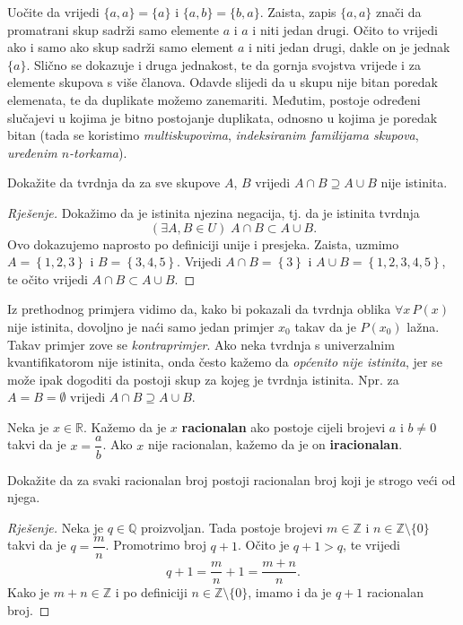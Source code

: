 \begin{remark}
Uočite da vrijedi $\{a, a\}=\{a\}$ i $\{a, b\}=\{b, a\}$. Zaista, zapis $\{a, a\}$ znači da promatrani skup sadrži samo elemente $a$ i $a$ i niti jedan drugi. Očito to vrijedi ako i samo ako skup sadrži samo element $a$ i niti jedan drugi, dakle on je jednak $\{a\}$. Slično se dokazuje i druga jednakost, te da gornja svojstva vrijede i za elemente skupova s više članova. Odavde slijedi da u skupu nije bitan poredak elemenata, te da duplikate možemo zanemariti. Međutim, postoje određeni slučajevi u kojima je bitno postojanje duplikata, odnosno u kojima je poredak bitan (tada se koristimo \textit{multiskupovima}, \textit{indeksiranim familijama skupova}, \textit{uređenim $n$-torkama}).
\end{remark}
\begin{exercise}
Dokažite da tvrdnja da za sve skupove $A$, $B$ vrijedi $A\cap B\supseteq A\cup B$ nije istinita.
\end{exercise}
\begin{proof}[Rješenje]
Dokažimo da je istinita njezina negacija, tj. da je istinita tvrdnja 
$$\left(\exists A, B\in U\right)\; A\cap B\subset A\cup B.$$
Ovo dokazujemo naprosto po definiciji unije i presjeka. Zaista, uzmimo $A=\left\{1, 2, 3\right\}$ i $B=\left\{3, 4, 5\right\}$. Vrijedi $A\cap B=\left\{3\right\}$ i $A\cup B=\left\{1, 2, 3, 4, 5\right\}$, te očito vrijedi $A\cap B\subset A\cup B$.
\end{proof}
Iz prethodnog primjera vidimo da, kako bi pokazali da tvrdnja oblika $\forall{x}\, P(x)$ nije istinita, dovoljno je naći samo jedan primjer $x_0$ takav da je $P(x_0)$ lažna. Takav primjer zove se \textit{kontraprimjer}. Ako neka tvrdnja s univerzalnim kvantifikatorom nije istinita, onda često kažemo da \textit{općenito nije istinita}, jer se može ipak dogoditi da postoji skup za kojeg je tvrdnja istinita. Npr. za $A=B=\emptyset$ vrijedi $A\cap B\supseteq A\cup B$.
\begin{definition}
Neka je $x\in \mathbb{R}$. Kažemo da je $x$ \textbf{racionalan} ako postoje cijeli brojevi $a$ i $b\neq 0$ takvi da je $x=\dfrac{a}{b}$. Ako $x$ nije racionalan, kažemo da je on \textbf{iracionalan}.
\end{definition}
\begin{exercise}
Dokažite da za svaki racionalan broj postoji racionalan broj koji je strogo veći od njega.
\end{exercise}
\begin{proof}[Rješenje]
Neka je $q\in \mathbb{Q}$ proizvoljan. Tada postoje brojevi $m\in \mathbb{Z}$ i $n\in \mathbb{Z}\setminus\{0\}$ takvi da je $q=\dfrac{m}{n}$. Promotrimo broj $q+1$. Očito je $q+1>q$, te vrijedi
$$q+1=\dfrac{m}{n}+1=\dfrac{m+n}{n}.$$
Kako je $m+n\in \mathbb{Z}$ i po definiciji $n\in \mathbb{Z}\setminus\{0\}$, imamo i da je $q+1$ racionalan broj.
\end{proof}
